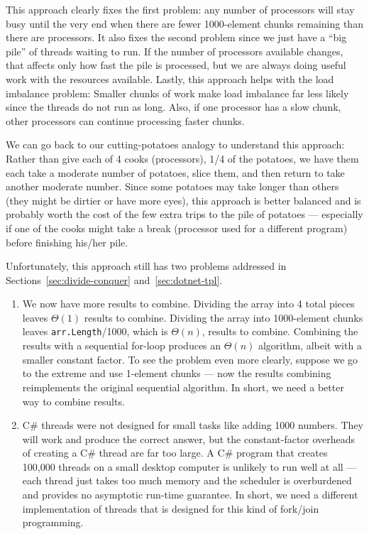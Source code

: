 \documentclass[10pt]{article}
\begin{document}
This approach clearly fixes the first problem: any number of
processors will stay busy until the very end when there are fewer
1000-element chunks remaining than there are processors.  It also
fixes the second problem since we just have a ``big pile'' of threads
waiting to run.  If the number of processors available changes, that
affects only how fast the pile is processed, but we are always doing
useful work with the resources available.  Lastly, this approach helps
with the load imbalance problem: Smaller chunks of work make load
imbalance far less likely since the threads do not run as long.  Also,
if one processor has a slow chunk, other processors can continue
processing faster chunks.

We can go back to our cutting-potatoes analogy to understand this
approach: Rather than give each of 4 cooks (processors), 1/4 of the
potatoes, we have them each take a moderate number of potatoes, slice
them, and then return to take another moderate number.  Since some
potatoes may take longer than others (they might be dirtier or have
more eyes), this approach is better balanced and is probably worth the
cost of the few extra trips to the pile of potatoes --- especially if
one of the cooks might take a break (processor used for a different
program) before finishing his/her pile.

Unfortunately, this approach still has two problems addressed in
Sections~\ref{sec:divide-conquer} and~\ref{sec:dotnet-tpl}.
\begin{enumerate}
\item We now have more results to combine.  Dividing the array into 4
  total pieces leaves $\Theta(1)$ results to combine.  Dividing the array
  into 1000-element chunks leaves {\tt arr.Length}/1000, which is
  $\Theta(n)$, results to combine.  Combining the results with a
  sequential for-loop produces an $\Theta(n)$ algorithm, albeit
  with a smaller constant factor.  To see the problem even more
  clearly, suppose we go to the extreme and use 1-element chunks ---
  now the results combining reimplements the original sequential
  algorithm.  In short, we need a better way to combine results.
\item C\# threads were not designed for small tasks like adding
  1000 numbers.  They will work and produce the correct answer, but
  the constant-factor overheads of creating a C\# thread are far too
  large.  A C\# program that creates 100,000 threads on a small
  desktop computer is unlikely to run well at all --- each thread just
  takes too much memory and the scheduler is overburdened and provides
  no asymptotic run-time guarantee.  In short, we need a different
  implementation of threads that is designed for this kind of
  fork/join programming.
\end{enumerate}
\end{document}
